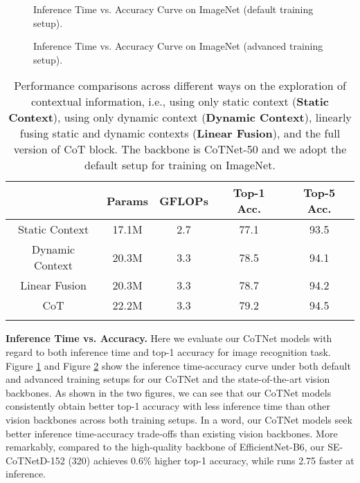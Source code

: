 \documentclass[10pt,twocolumn,letterpaper]{article}
\begin{document}
\begin{figure}[!tb]
\vspace{-0.10in}
\vspace{-0.10in}
\caption{Inference Time vs. Accuracy Curve on ImageNet (default training setup).}
\vspace{-0.10in}
\label{fig:inference_time}
\end{figure}

\begin{figure}[!tb]
\vspace{-0.10in}
\vspace{-0.10in}
\caption{Inference Time vs. Accuracy Curve on ImageNet (advanced training setup).}
\vspace{-0.10in}
\label{fig:inference_time_advance}
\end{figure}

\begin{table}[!tb]\small
  \centering
  \caption{Performance comparisons across different ways on the exploration of contextual information, i.e., using only static context (\textbf{Static Context}), using only dynamic context (\textbf{Dynamic Context}), linearly fusing static and dynamic contexts (\textbf{Linear Fusion}), and the full version of CoT block. The backbone is CoTNet-50 and we adopt the default setup for training on ImageNet.}
  \setlength{\tabcolsep}{3.5pt}
\begin{tabular}{c|c|c|c|c}
\Xhline{2\arrayrulewidth}
                & Params & GFLOPs & Top-1 Acc. & Top-5 Acc. \\ \hline
Static Context     & 17.1M  & 2.7    & 77.1       & 93.5          \\
Dynamic Context     & 20.3M  & 3.3    & 78.5       & 94.1       \\
Linear Fusion   & 20.3M  & 3.3    & 78.7       & 94.2       \\ \hline
CoT             & 22.2M  & 3.3    & 79.2       & 94.5       \\ \Xhline{2\arrayrulewidth}
\end{tabular}
\vspace{-0.22in}
\label{table:as}
\end{table}

\textbf{Inference Time vs. Accuracy.}
Here we evaluate our CoTNet models with regard to both inference time and top-1 accuracy for image recognition task. Figure \ref{fig:inference_time} and Figure \ref{fig:inference_time_advance} show the inference time-accuracy curve under both default and advanced training setups for our CoTNet and the state-of-the-art vision backbones. As shown in the two figures, we can see that our CoTNet models consistently obtain better top-1 accuracy with less inference time than other vision backbones across both training setups. In a word, our CoTNet models seek better inference time-accuracy trade-offs than existing vision backbones. More remarkably, compared to the high-quality backbone of EfficientNet-B6, our SE-CoTNetD-152 (320) achieves 0.6\% higher top-1 accuracy, while runs 2.75 faster at inference.
\end{document}
